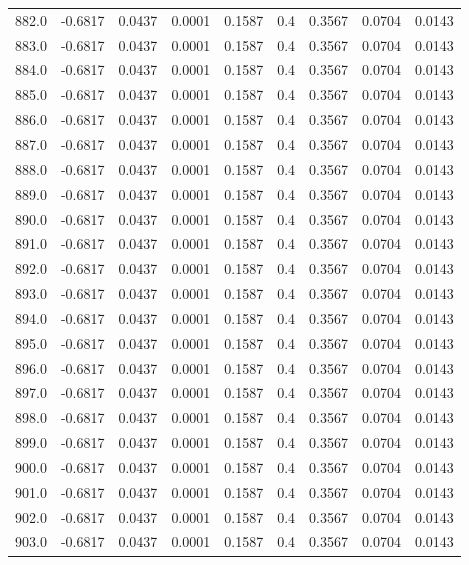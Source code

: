 \begin{longtable}{lrrrrrrrr}
882.0 & -0.6817 & 0.0437 & 0.0001 & 0.1587 & 0.4 & 0.3567 & 0.0704 & 0.0143 \\
883.0 & -0.6817 & 0.0437 & 0.0001 & 0.1587 & 0.4 & 0.3567 & 0.0704 & 0.0143 \\
884.0 & -0.6817 & 0.0437 & 0.0001 & 0.1587 & 0.4 & 0.3567 & 0.0704 & 0.0143 \\
885.0 & -0.6817 & 0.0437 & 0.0001 & 0.1587 & 0.4 & 0.3567 & 0.0704 & 0.0143 \\
886.0 & -0.6817 & 0.0437 & 0.0001 & 0.1587 & 0.4 & 0.3567 & 0.0704 & 0.0143 \\
887.0 & -0.6817 & 0.0437 & 0.0001 & 0.1587 & 0.4 & 0.3567 & 0.0704 & 0.0143 \\
888.0 & -0.6817 & 0.0437 & 0.0001 & 0.1587 & 0.4 & 0.3567 & 0.0704 & 0.0143 \\
889.0 & -0.6817 & 0.0437 & 0.0001 & 0.1587 & 0.4 & 0.3567 & 0.0704 & 0.0143 \\
890.0 & -0.6817 & 0.0437 & 0.0001 & 0.1587 & 0.4 & 0.3567 & 0.0704 & 0.0143 \\
891.0 & -0.6817 & 0.0437 & 0.0001 & 0.1587 & 0.4 & 0.3567 & 0.0704 & 0.0143 \\
892.0 & -0.6817 & 0.0437 & 0.0001 & 0.1587 & 0.4 & 0.3567 & 0.0704 & 0.0143 \\
893.0 & -0.6817 & 0.0437 & 0.0001 & 0.1587 & 0.4 & 0.3567 & 0.0704 & 0.0143 \\
894.0 & -0.6817 & 0.0437 & 0.0001 & 0.1587 & 0.4 & 0.3567 & 0.0704 & 0.0143 \\
895.0 & -0.6817 & 0.0437 & 0.0001 & 0.1587 & 0.4 & 0.3567 & 0.0704 & 0.0143 \\
896.0 & -0.6817 & 0.0437 & 0.0001 & 0.1587 & 0.4 & 0.3567 & 0.0704 & 0.0143 \\
897.0 & -0.6817 & 0.0437 & 0.0001 & 0.1587 & 0.4 & 0.3567 & 0.0704 & 0.0143 \\
898.0 & -0.6817 & 0.0437 & 0.0001 & 0.1587 & 0.4 & 0.3567 & 0.0704 & 0.0143 \\
899.0 & -0.6817 & 0.0437 & 0.0001 & 0.1587 & 0.4 & 0.3567 & 0.0704 & 0.0143 \\
900.0 & -0.6817 & 0.0437 & 0.0001 & 0.1587 & 0.4 & 0.3567 & 0.0704 & 0.0143 \\
901.0 & -0.6817 & 0.0437 & 0.0001 & 0.1587 & 0.4 & 0.3567 & 0.0704 & 0.0143 \\
902.0 & -0.6817 & 0.0437 & 0.0001 & 0.1587 & 0.4 & 0.3567 & 0.0704 & 0.0143 \\
903.0 & -0.6817 & 0.0437 & 0.0001 & 0.1587 & 0.4 & 0.3567 & 0.0704 & 0.0143 \\

\end{longtable}
